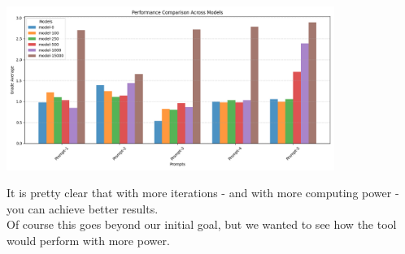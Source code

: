 \documentclass[12pt]{article}
\begin{document}
\begin{center}
    \includegraphics[width=0.8\textwidth]{img/plots/15k-performance-comparison.png}
\end{center}
It is pretty clear that with more iterations - and with more computing power - you can achieve better results.\\
Of course this goes beyond our initial goal, but we wanted to see how the tool would perform with more power.
\end{document}
